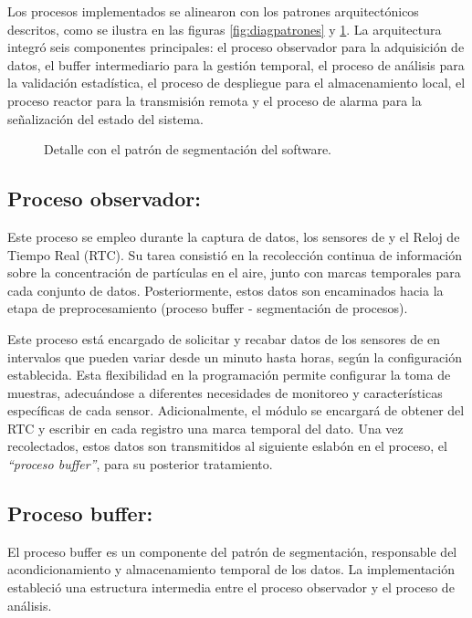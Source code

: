 Los procesos implementados se alinearon con los patrones arquitectónicos descritos, como se ilustra en las figuras \ref{fig:diagpatrones} y \ref{fig:diagsegmentacion}. La arquitectura integró seis componentes principales: el proceso observador para la adquisición de datos, el buffer intermediario para la gestión temporal, el proceso de análisis para la validación estadística, el proceso de despliegue para el almacenamiento local, el proceso reactor para la transmisión remota y el proceso de alarma para la señalización del estado del sistema.

\begin{figure}[htpb]
	\centering
	\footnotesize
	
	\caption{Detalle con el patrón de segmentación del software.}
	\label{fig:diagsegmentacion}
\end{figure}



\subsection{Proceso observador:}

Este proceso se empleo durante la captura de datos,  los sensores de \MPF y el Reloj de Tiempo Real (RTC). Su tarea consistió en la recolección continua de información sobre la concentración de partículas en el aire, junto con marcas temporales para cada conjunto de datos. Posteriormente, estos datos son encaminados hacia la etapa de preprocesamiento (proceso buffer - segmentación de procesos).

Este proceso está encargado de solicitar y recabar datos de los sensores de \MPF en intervalos que pueden variar desde un minuto hasta horas, según la configuración establecida. Esta flexibilidad en la programación permite configurar la toma de muestras, adecuándose a diferentes necesidades de monitoreo y características específicas de cada sensor. Adicionalmente, el módulo se encargará de obtener del RTC y escribir en cada registro una marca temporal del dato. Una vez recolectados, estos datos son transmitidos al siguiente eslabón en el proceso, el \textit{``proceso buffer''}, para su posterior tratamiento.


\subsection{Proceso buffer:} 

El proceso buffer es un componente del patrón de segmentación, responsable del acondicionamiento y almacenamiento temporal de los datos. La implementación estableció una estructura intermedia entre el proceso observador y el proceso de análisis.

